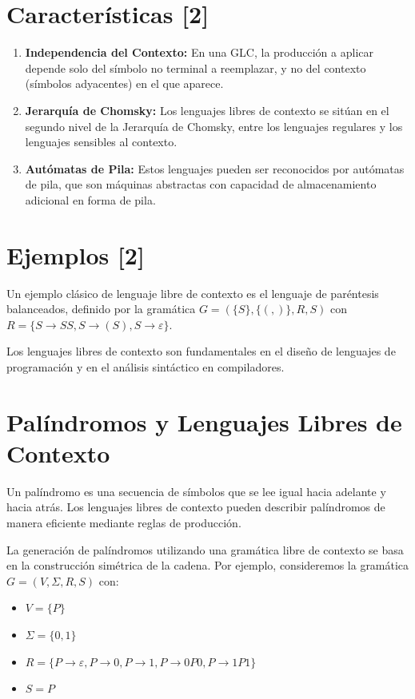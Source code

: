 \documentclass[11pt]{article} %
\begin{document}
	\section{Características [2]}
	\begin{enumerate}
		\item \textbf{Independencia del Contexto:} En una GLC, la producción a aplicar depende solo del símbolo no terminal a reemplazar, y no del contexto (símbolos adyacentes) en el que aparece.
		\item \textbf{Jerarquía de Chomsky:} Los lenguajes libres de contexto se sitúan en el segundo nivel de la Jerarquía de Chomsky, entre los lenguajes regulares y los lenguajes sensibles al contexto.
		\item \textbf{Autómatas de Pila:} Estos lenguajes pueden ser reconocidos por autómatas de pila, que son máquinas abstractas con capacidad de almacenamiento adicional en forma de pila.
	\end{enumerate}
	
	\section{Ejemplos [2]}
	Un ejemplo clásico de lenguaje libre de contexto es el lenguaje de paréntesis balanceados, definido por la gramática \(G = (\{S\}, \{(, )\}, R, S)\) con \(R = \{S \rightarrow SS, S \rightarrow (S), S \rightarrow \varepsilon\}\).
	
	Los lenguajes libres de contexto son fundamentales en el diseño de lenguajes de programación y en el análisis sintáctico en compiladores.
	
	\section{Palíndromos y Lenguajes Libres de Contexto}
	Un palíndromo es una secuencia de símbolos que se lee igual hacia adelante y hacia atrás. Los lenguajes libres de contexto pueden describir palíndromos de manera eficiente mediante reglas de producción.
	

	La generación de palíndromos utilizando una gramática libre de contexto se basa en la construcción simétrica de la cadena. Por ejemplo, consideremos la gramática \(G = (V, \Sigma, R, S)\) con:
	\begin{itemize}
		\item \(V = \{P\}\)
		\item \(\Sigma = \{0, 1\}\)
		\item \(R = \{ P \rightarrow \varepsilon, P \rightarrow 0, P \rightarrow 1, P \rightarrow 0P0, P \rightarrow 1P1 \}\)
		\item \(S = P\)
	\end{itemize}
	
\end{document}

